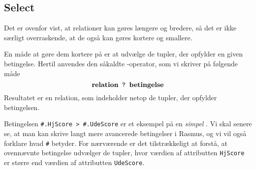 \subsection{Select}
Det er ovenfor vist, at relationer kan g\o{}res l\ae{}ngere og bredere,
s\aa{} det er ikke s\ae{}rligt overraskende, at de ogs\aa{} kan g\o{}res
kortere og smallere.

En m\aa{}de at g\o{}re dem kortere p\aa{} er at udv\ae{}lge de tupler,
der opfylder en given betingelse. Hertil anvendes den s\aa{}kaldte
{\em {}}-operator, som vi skriver p\aa{} f\o{}lgende m\aa{}de
$$ \mbox{\bf relation} \mbox{\tt ~?~} \mbox{\bf betingelse} $$
Resultatet er en relation, som indeholder netop de tupler, der opfylder
betingelsen.


Betingelsen \verb"#.HjScore > #.UdeScore" er et eksempel p\aa{} en
{\em simpel\/} . Vi skal senere se, at man kan skrive langt
mere avancerede be\-ting\-elser i {\sc Rasmus}, og vi vil ogs\aa{} forklare
hvad \verb"#" betyder. For n\ae{}r\-v\ae{}r\-en\-de er det tilstr\ae{}kkeligt
at forst\aa{}, at ovenn\ae{}vnte betingelse udv\ae{}lger de tup\-ler,
hvor v\ae{}rdien af attributten \verb"HjScore" er st\o{}rre end
v\ae{}rdien af attributten \verb"UdeScore".

